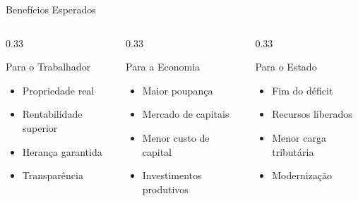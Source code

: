 \documentclass{libs/ufc_format}
\begin{document}
\begin{frame}{Benefícios Esperados}
    \begin{columns}
        \begin{column}{0.33\textwidth}
            \begin{block}{Para o Trabalhador}
                \begin{itemize}
                    \item Propriedade real
                    \item Rentabilidade superior
                    \item Herança garantida
                    \item Transparência
                \end{itemize}
            \end{block}
        \end{column}
        \begin{column}{0.33\textwidth}
            \begin{block}{Para a Economia}
                \begin{itemize}
                    \item Maior poupança
                    \item Mercado de capitais
                    \item Menor custo de capital
                    \item Investimentos produtivos
                \end{itemize}
            \end{block}
        \end{column}
        \begin{column}{0.33\textwidth}
            \begin{block}{Para o Estado}
                \begin{itemize}
                    \item Fim do déficit
                    \item Recursos liberados
                    \item Menor carga tributária
                    \item Modernização
                \end{itemize}
            \end{block}
        \end{column}
    \end{columns}
\end{frame}
\end{document}
